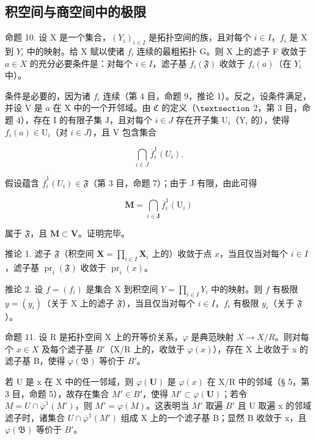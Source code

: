 \subsection{积空间与商空间中的极限}

命题 10. 设 X 是一个集合，\((Y_{i})_{i\in I}\) 是拓扑空间的族，且对每个 \(i\in I\)，\(f_{i}\) 是 X 到 \(Y_{i}\) 中的映射。给 X 赋以使诸 \(f_{i}\) 连续的最粗拓扑 G。则 X 上的滤子 F 收敛于 \(a\in X\) 的充分必要条件是：对每个 \(i\in I\)，滤子基 \(f_{i}(\mathfrak{F})\) 收敛于 \(f_{i}(a)\)（在 \(Y_{i}\) 中）。

条件是必要的，因为诸 \(f_{i}\) 连续（第 4 目，命题 9，推论 1）。反之，设条件满足，并设 V 是 \(a\) 在 X 中的一个开邻域。由 \(\mathfrak{C}\) 的定义（\(\S\) 2，第 3 目，命题 4），存在 I 的有限子集 J，且对每个 \(i\in J\) 存在开子集 \(\mathrm{U}_{i}\)（\(\mathrm{Y}_{i}\) 的），使得 \(f_{i}(a)\in\mathrm{U}_{i}\)（对 \(i\in J\)），且 V 包含集合

\[
\bigcap_ {i \in J} \overline {{f}} _ {i} ^ {1} (U _ {i}).
\]

假设蕴含 \(\overline{f}_{i}^{1}(U_{i})\in\mathfrak{F}\)（第 3 目，命题 7）；由于 J 有限，由此可得

\[
\mathbf {M} = \bigcap_ {i \in \mathbf {J}} \overline {{f}} _ {i} ^ {1} (\mathrm{U} _ {i})
\]

属于 \(\mathfrak{F}\)，且 \(\mathbf{M} \subset \mathbf{V}\)。证明完毕。

推论 1. 滤子 \(\mathfrak{F}\)（积空间 \(\mathbf{X} = \prod_{i\in I}\mathbf{X}_i\) 上的）收敛于点 \(x\)，当且仅当对每个 \(i\in I\)，滤子基 \(\operatorname{pr}_{i}(\mathfrak{F})\) 收敛于 \(\operatorname{pr}_{i}(x)\)。

推论 2. 设 \(f = (f_{i})\) 是集合 X 到积空间 \(Y = \prod_{i \in I} Y_{i}\) 中的映射。则 \(f\) 有极限 \(y = (y_{i})\)（关于 X 上的滤子 \(\mathfrak{F}\)），当且仅当对每个 \(i \in I\)，\(f_{i}\) 有极限 \(y_{i}\)（关于 \(\mathfrak{F}\)）。

命题 11. 设 R 是拓扑空间 X 上的开等价关系，\(\varphi\) 是典范映射 \(X \rightarrow X/R\)。则对每个 \(x \in X\) 及每个滤子基 \(B'\)（X/R 上的，收敛于 \(\varphi(x)\)），存在 X 上收敛于 x 的滤子基 B，使得 \(\varphi(\mathfrak{B})\) 等价于 \(B'\)。

若 U 是 x 在 X 中的任一邻域，则 \(\varphi(\mathbf{U})\) 是 \(\varphi(x)\) 在 X/R 中的邻域（§ 5，第 3 目，命题 5），故存在集合 \(M' \in B'\)，使得 \(M' \subset \varphi(\mathbf{U})\)；若令 \(M = U \cap \overline{\varphi}^{1}(M')\)，则 \(M' = \varphi(M)\)。这表明当 \(M'\) 取遍 \(B'\) 且 U 取遍 x 的邻域滤子时，诸集合 \(U \cap \overline{\varphi}^{1}(M')\) 组成 X 上的一个滤子基 B；显然 B 收敛于 x，且 \(\varphi(\mathfrak{B})\) 等价于 \(B'\)。

